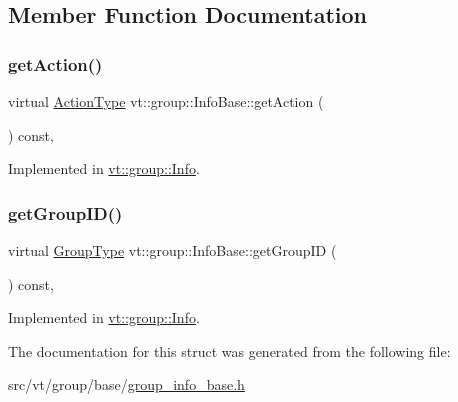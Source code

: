 \subsection{Member Function Documentation}
\mbox{\label{structvt_1_1group_1_1_info_base_a643adfea212db8b896b201832bed0445}} 
\subsubsection{\texorpdfstring{get\+Action()}{getAction()}}
{\footnotesize\ttfamily virtual \hyperlink{namespacevt_ae0a5a7b18cc99d7b732cb4d44f46b0f3}{Action\+Type} vt\+::group\+::\+Info\+Base\+::get\+Action (\begin{DoxyParamCaption}{ }\end{DoxyParamCaption}) const\hspace{0.3cm}{\ttfamily [protected]}, {}}



Implemented in \hyperlink{structvt_1_1group_1_1_info_a399b8266c01f53484469b3b14cdc8640}{vt\+::group\+::\+Info}.

\mbox{\label{structvt_1_1group_1_1_info_base_afbb8a9919c924c50be2b99e2dc7cbca2}} 
\subsubsection{\texorpdfstring{get\+Group\+I\+D()}{getGroupID()}}
{\footnotesize\ttfamily virtual \hyperlink{namespacevt_a27b5e4411c9b6140c49100e050e2f743}{Group\+Type} vt\+::group\+::\+Info\+Base\+::get\+Group\+ID (\begin{DoxyParamCaption}{ }\end{DoxyParamCaption}) const\hspace{0.3cm}{\ttfamily [protected]}, {}}



Implemented in \hyperlink{structvt_1_1group_1_1_info_a09fcb16e74a5ae3043859ae70b5b57a9}{vt\+::group\+::\+Info}.



The documentation for this struct was generated from the following file\+:\begin{DoxyCompactItemize}
\item 
src/vt/group/base/\hyperlink{group__info__base_8h}{group\+\_\+info\+\_\+base.\+h}\end{DoxyCompactItemize}
